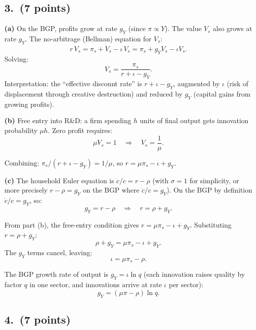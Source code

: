 \documentclass[a4paper,11pt]{article}
\begin{document}
\subsection*{3.\ (7 points)}

\begin{answerbox}
\textbf{(a)} On the BGP, profits grow at rate $g_Y$ (since $\pi \propto Y$).  The value
$V_s$ also grows at rate $g_Y$.  The no-arbitrage (Bellman) equation for $V_s$:
\[
    r\,V_s = \pi_s + \dot{V}_s - \iota\,V_s = \pi_s + g_Y V_s - \iota V_s.
\]
Solving:
\[
    \boxed{V_s = \frac{\pi_s}{r + \iota - g_Y}.}
\]
Interpretation: the ``effective discount rate'' is $r + \iota - g_Y$, augmented by
$\iota$ (risk of displacement through creative destruction) and reduced by $g_Y$
(capital gains from growing profits).

\textbf{(b)} Free entry into R\&D: a firm spending $h$ units of final output gets
innovation probability $\mu h$.  Zero profit requires:
\[
    \mu V_s = 1 \quad\Longrightarrow\quad V_s = \frac{1}{\mu}.
\]

Combining: $\pi_s/(r + \iota - g_Y) = 1/\mu$, so $r = \mu\pi_s - \iota + g_Y$.

\textbf{(c)} The household Euler equation is $\dot{c}/c = r - \rho$ (with $\sigma = 1$
for simplicity, or more precisely $r - \rho = g_Y$ on the BGP where $\dot{c}/c = g_Y$).
On the BGP by definition $\dot{c}/c = g_Y$, so:
\[
    g_Y = r - \rho \quad\Longrightarrow\quad r = \rho + g_Y.
\]

From part (b), the free-entry condition gives $r = \mu\pi_s - \iota + g_Y$.
Substituting $r = \rho + g_Y$:
\[
    \rho + g_Y = \mu\pi_s - \iota + g_Y.
\]
The $g_Y$ terms cancel, leaving:
\[
    \boxed{\iota = \mu\pi_s - \rho.}
\]

The BGP growth rate of output is $g_Y = \iota\ln q$ (each innovation raises quality by
factor $q$ in one sector, and innovations arrive at rate $\iota$ per sector):
\[
    \boxed{g_Y = (\mu\pi - \rho)\ln q.}
\]
\end{answerbox}

\subsection*{4.\ (7 points)}
\end{document}
